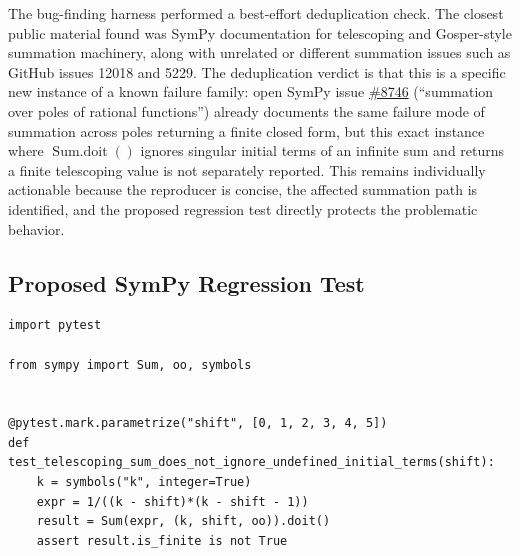 \documentclass[11pt]{article}
\begin{document}
The bug-finding harness performed a best-effort deduplication check. The closest public material found was SymPy documentation for telescoping and Gosper-style summation machinery, along with unrelated or different summation issues such as GitHub issues 12018 and 5229. The deduplication verdict is that this is a specific new instance of a known failure family: open SymPy issue \href{https://github.com/sympy/sympy/issues/8746}{\#8746} (``summation over poles of rational functions'') already documents the same failure mode of summation across poles returning a finite closed form, but this exact instance where \(\operatorname{Sum.doit}()\) ignores singular initial terms of an infinite sum and returns a finite telescoping value is not separately reported. This remains individually actionable because the reproducer is concise, the affected summation path is identified, and the proposed regression test directly protects the problematic behavior.

\subsection{Proposed SymPy Regression Test}

\medskip

\begin{lstlisting}[style=bugpython]
import pytest

from sympy import Sum, oo, symbols


@pytest.mark.parametrize("shift", [0, 1, 2, 3, 4, 5])
def test_telescoping_sum_does_not_ignore_undefined_initial_terms(shift):
    k = symbols("k", integer=True)
    expr = 1/((k - shift)*(k - shift - 1))
    result = Sum(expr, (k, shift, oo)).doit()
    assert result.is_finite is not True
\end{lstlisting}
\end{document}
